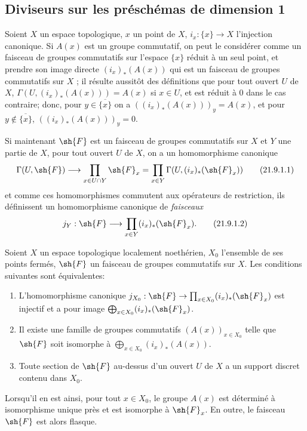 \subsection{Diviseurs sur les préschémas de dimension 1}
\label{IV.21.9}

\begin{env}[21.9.1]
\label{IV.21.9.1}
Soient $X$ un espace topologique, $x$ un point de $X$, $i_x:\{x\}\to X$ l'injection canonique.
Si $A(x)$ est un groupe commutatif, on peut le considérer comme un faisceau de groupes commutatifs sur l'espace $\{x\}$ réduit à un seul point, et prendre son image directe $(i_x)_*(A(x))$ qui est un faisceau de groupes commutatifs sur $X$ ;
il résulte aussitôt des définitions que pour tout ouvert $U$ de $X$, $\Gamma(U,(i_x)_*(A(x)))=A(x)$ si $x\in U$, et est réduit à $0$ dans le cas contraire;
donc, pour $y\in\overline{\{x\}}$ on a $((i_x)_*(A(x)))_y=A(x)$, et pour $y\notin\overline{\{x\}}$, $((i_x)_*(A(x)))_y=0$.

Si maintenant $\sh{F}$ est un faisceau de groupes commutatifs sur $X$ et $Y$ une partie de $X$, pour tout ouvert $U$ de $X$, on a un homomorphisme canonique
\[
\label{IV.21.9.1.1}
  \Gamma(U,\sh{F})\to\prod_{x\in U\cap Y}\sh{F}_x
  =\prod_{x\in Y}\Gamma(U,(i_x)_*(\sh{F}_x))
  \tag{21.9.1.1}
\]
et comme ces homomorphismes commutent aux opérateurs de restriction, ils définissent un homomorphisme canonique de \emph{faisceaux}
\[
\label{IV.21.9.1.2}
  j_Y:\sh{F}\to\prod_{x\in Y}(i_x)_*(\sh{F}_x).
  \tag{21.9.1.2}
\]
\end{env}

\begin{lemma}[21.9.2]
\label{IV.21.9.2}
Soient $X$ un espace topologique localement noethérien, $X_0$ l'ensemble de ses points fermés, $\sh{F}$ un faisceau de groupes commutatifs sur $X$.
Les conditions suivantes sont équivalentes:
\begin{enumerate}[label=\emph{\alph*)}]
  \item L'homomorphisme canonique $j_{X_0}:\sh{F}\to\prod_{x\in X_0}(i_x)_*(\sh{F}_x)$ est injectif et a pour image $\bigoplus_{x\in X_0}(i_x)_*(\sh{F}_x)$.
  \item[\rm a$'$)] Il existe une famille de groupes commutatifs $(A(x))_{x\in X_0}$ telle que $\sh{F}$ soit isomorphe à $\bigoplus_{x\in X_0}(i_x)_*(A(x))$.
  \item Toute section de $\sh{F}$ au-dessus d'un ouvert $U$ de $X$ a un support discret contenu dans $X_0$.
\end{enumerate}
Lorsqu'il en est ainsi, pour tout $x\in X_0$, le groupe $A(x)$ est déterminé à isomorphisme unique près et est isomorphe à $\sh{F}_x$.
En outre, le faisceau $\sh{F}$ est alors flasque.
\end{lemma}

